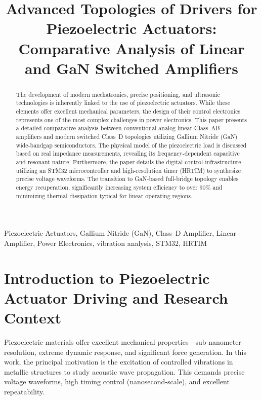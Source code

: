 \documentclass[10pt, conference, letterpaper]{IEEEtran}
\begin{document}
\title{Advanced Topologies of Drivers for Piezoelectric Actuators: Comparative Analysis of Linear and GaN Switched Amplifiers}

\author{
}

\maketitle

\begin{abstract}
The development of modern mechatronics, precise positioning, and ultrasonic technologies is inherently linked to the use of piezoelectric actuators. While these elements offer excellent mechanical parameters, the design of their control electronics represents one of the most complex challenges in power electronics. This paper presents a detailed comparative analysis between conventional analog linear Class~AB amplifiers and modern switched Class~D topologies utilizing Gallium Nitride (GaN) wide-bandgap semiconductors. The physical model of the piezoelectric load is discussed based on real impedance measurements, revealing its frequency-dependent capacitive and resonant nature. Furthermore, the paper details the digital control infrastructure utilizing an STM32 microcontroller and high-resolution timer (HRTIM) to synthesize precise voltage waveforms. The transition to GaN-based full-bridge topology enables energy recuperation, significantly increasing system efficiency to over 90\% and minimizing thermal dissipation typical for linear operating regions.
\end{abstract}

\begin{IEEEkeywords}
Piezoelectric Actuators, Gallium Nitride (GaN), Class~D Amplifier, Linear Amplifier, Power Electronics, vibration analysis, STM32, HRTIM
\end{IEEEkeywords}

\section{Introduction to Piezoelectric Actuator Driving and Research Context}
Piezoelectric materials offer excellent mechanical properties—sub-nanometer resolution, extreme dynamic response, and significant force generation. In this work, the principal motivation is the excitation of controlled vibrations in metallic structures to study acoustic wave propagation. This demands precise voltage waveforms, high timing control (nanosecond-scale), and excellent repeatability.
\end{document}

